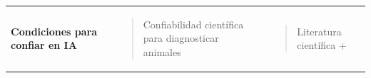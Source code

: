 \documentclass[
]{article}
\newcounter{none} %
\begin{document}
{\def\LTcaptype{none} %
\begin{longtable}[]{@{}
  >{\raggedright\arraybackslash}p{}
  >{\raggedright\arraybackslash}p{}
  >{\raggedright\arraybackslash}p{}@{}}
\toprule\noalign{}
\begin{minipage}[b]{\linewidth}\raggedright
\textbf{Condiciones para confiar en IA}
\end{minipage} & \begin{minipage}[b]{\linewidth}\raggedright
\begin{quote}
Confiabilidad científica para diagnosticar animales
\end{quote}
\end{minipage} & \begin{minipage}[b]{\linewidth}\raggedright
\begin{quote}
Literatura científica +


\end{quote}
\end{minipage}
\end{longtable}}
\end{document}
